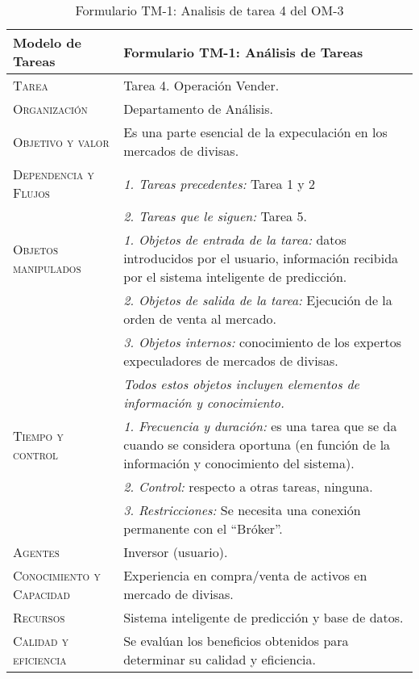 \begin{table}[H]
	\scriptsize
	\begin{tabularx}{\textwidth}{|l|X|} 
		\hline	
		\textbf{Modelo de Tareas} & \textbf{Formulario TM-1: Análisis de Tareas} \\ 
		\hline\hline
		\textsc{Tarea} & Tarea 4. Operación Vender.\\ 
		\hline
		\textsc{Organización}  & Departamento de Análisis.\\ 
		\hline
		\textsc{Objetivo y valor} &  Es una parte esencial de la expeculación en los mercados de divisas.\\ 
		\hline
		\textsc{Dependencia y Flujos} & \textit{1. Tareas precedentes:} Tarea 1 y 2\\ &  \textit{2. Tareas que le siguen:} Tarea 5. \\
		\hline
		\textsc{Objetos manipulados} & \textit{1. Objetos de entrada de la tarea:} datos introducidos por el usuario, información recibida por el sistema inteligente de predicción.\\ & \textit{2. Objetos de salida de la tarea:} Ejecución de la orden de venta al mercado.\\  & \textit{3. Objetos internos:} conocimiento de los  expertos expeculadores de mercados de divisas. \\ & \emph{Todos estos objetos incluyen elementos de información y conocimiento.}\\
		\hline
		\textsc{Tiempo y control} & \textit{1. Frecuencia y duración:} es una tarea que se da cuando se considera  oportuna (en función de la información y conocimiento del sistema).\\ & \textit{2. Control:} respecto a otras  tareas, ninguna.\\ & \textit{3. Restricciones:} Se necesita una conexión permanente con el ``Bróker''. \\
		\hline
		\textsc{Agentes} & Inversor (usuario).\\
		\hline
		\textsc{Conocimiento y Capacidad} & Experiencia en compra/venta de activos en mercado de divisas. \\
		\hline
		\textsc{Recursos} & Sistema inteligente de predicción y  base de datos. \\
		\hline
		\textsc{Calidad y eficiencia} & Se evalúan los beneficios obtenidos para determinar su calidad y eficiencia. \\
		\hline
	\end{tabularx}
	\caption{\label{tab:TM1T4}Formulario TM-1: Analisis de tarea 4 del OM-3}
\end{table} 

